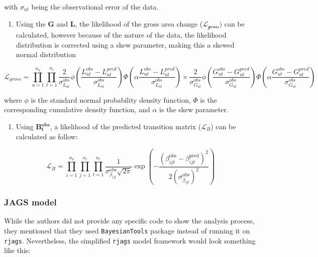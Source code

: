 \documentclass[
  letterpaper,
  DIV=11,
  numbers=noendperiod]{scrartcl}
\providecommand{\tightlist}{%
  \setlength{\itemsep}{0pt}\setlength{\parskip}{0pt}}\usepackage{longtable,booktabs,array}
\begin{document}
with \(\sigma_{ut}\) being the observational error of the data.

\begin{enumerate}
\def\labelenumi{\arabic{enumi}.}
\setcounter{enumi}{1}
\tightlist
\item
  Using the \(\mathbf{G}\) and \(\mathbf{L}\), the likelihood of the
  gross area change (\(\mathcal{L_{gross}})\) can be calculated, however
  because of the nature of the data, the likelihood distribution is
  corrected using a skew parameter, making this a skewed normal
  distribution
\end{enumerate}

\[\mathcal{L}_{gross} = \prod_{u=1}^{n_u} \prod_{t=1}^{n_t} \frac{2}{\sigma_{L_{ut}}^{obs}} \phi \left( \frac{L_{ut}^{obs} - L_{ut}^{pred}}{\sigma_{L_{ut}}^{obs}} \right) 
\Phi \left( \alpha \frac{L_{ut}^{obs} - L_{ut}^{pred}}{\sigma_{L_{ut}}^{obs}} \right) 
\times \frac{2}{\sigma_{G_{ut}}^{obs}} 
\phi \left( \frac{G_{ut}^{obs} - G_{ut}^{pred}}{\sigma_{G_{ut}}^{obs}} \right) 
\Phi \left( \alpha \frac{G_{ut}^{obs} - G_{ut}^{pred}}{\sigma_{G_{ut}}^{obs}} \right) \tag{6}\]

where \(\phi\) is the standard normal probability density function,
\(\Phi\) is the corresponding cumulative density function, and
\(\alpha\) is the skew parameter.

\begin{enumerate}
\def\labelenumi{\arabic{enumi}.}
\setcounter{enumi}{2}
\tightlist
\item
  Using \(\mathbf{B_{t}^{obs}}\), a likelihood of the predicted
  transition matrix (\(\mathcal{L}_{B}\)) can be calculated as follow:
\end{enumerate}

\[
\mathcal{L}_{B} = \prod_{i=1}^{n_u} \prod_{j=1}^{n_i} \prod_{t=1}^{n_t} \frac{1}{\sigma_{\beta_{ijt}}^{\text{obs}} \sqrt{2\pi}} \exp \left( -\frac{\left( \beta_{ijt}^{\text{obs}} - \beta_{ijt}^{\text{pred}} \right)^2}{2 \left( \sigma_{\beta_{ijt}}^{\text{obs}} \right)^2} \right) \tag{7}
\]

\hypertarget{jags-model}{%
\subsubsection{JAGS model}\label{jags-model}}

While the authors did not provide any specific code to show the analysis
process, they mentioned that they used \texttt{BayesianTools} package
instead of running it on \texttt{rjags}. Nevertheless, the simplified
\texttt{rjags} model framework would look something like this:
\end{document}
